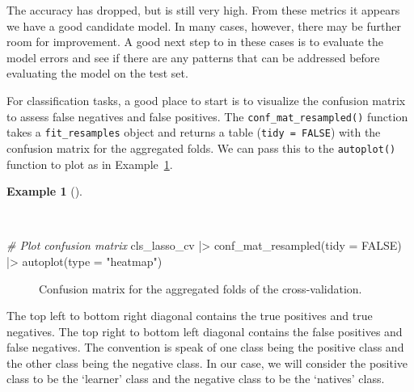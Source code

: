 \documentclass[
  letterpaper,
  DIV=11,
  numbers=noendperiod]{scrreprt}
\newenvironment{Shaded}{\begin{snugshade}}{\end{snugshade}}
\newcommand{\AttributeTok}[1]{\textcolor[rgb]{0.00,0.00,0.00}{#1}}
\newcommand{\CommentTok}[1]{\textcolor[rgb]{0.00,0.00,0.00}{\textit{#1}}}
\newcommand{\ConstantTok}[1]{\textcolor[rgb]{0.00,0.00,0.00}{#1}}
\newcommand{\FunctionTok}[1]{\textcolor[rgb]{0.00,0.00,0.00}{#1}}
\newcommand{\NormalTok}[1]{\textcolor[rgb]{0.00,0.00,0.00}{#1}}
\newcommand{\SpecialCharTok}[1]{\textcolor[rgb]{0.00,0.00,0.00}{#1}}
\newcommand{\StringTok}[1]{\textcolor[rgb]{0.00,0.00,0.00}{#1}}
\theoremstyle{definition}
\newtheorem{example}{Example}[chapter]
\theoremstyle{remark}
\begin{document}
The accuracy has dropped, but is still very high. From these metrics it
appears we have a good candidate model. In many cases, however, there
may be further room for improvement. A good next step to in these cases
is to evaluate the model errors and see if there are any patterns that
can be addressed before evaluating the model on the test set.

For classification tasks, a good place to start is to visualize the
confusion matrix to assess false negatives and false positives. The
\texttt{conf\_mat\_resampled()} function takes a \texttt{fit\_resamples}
object and returns a table (\texttt{tidy\ =\ FALSE}) with the confusion
matrix for the aggregated folds. We can pass this to the
\texttt{autoplot()} function to plot as in
Example~\ref{exm-pda-class-tune-hyperparameters-evaluate-workflow-cv-confusion}.

\begin{example}[]\protect\hypertarget{exm-pda-class-tune-hyperparameters-evaluate-workflow-cv-confusion}{}\label{exm-pda-class-tune-hyperparameters-evaluate-workflow-cv-confusion}

~

\begin{Shaded}
\begin{Highlighting}[]
\CommentTok{\# Plot confusion matrix}
\NormalTok{cls\_lasso\_cv }\SpecialCharTok{|\textgreater{}}
  \FunctionTok{conf\_mat\_resampled}\NormalTok{(}\AttributeTok{tidy =} \ConstantTok{FALSE}\NormalTok{) }\SpecialCharTok{|\textgreater{}}
  \FunctionTok{autoplot}\NormalTok{(}\AttributeTok{type =} \StringTok{"heatmap"}\NormalTok{)}
\end{Highlighting}
\end{Shaded}

\begin{figure}[H]


\caption{\label{fig-class-tune-hyperparameters-evaluate-workflow-cv-confusion}Confusion
matrix for the aggregated folds of the cross-validation.}

\end{figure}%

\end{example}

The top left to bottom right diagonal contains the true positives and
true negatives. The top right to bottom left diagonal contains the false
positives and false negatives. The convention is speak of one class
being the positive class and the other class being the negative class.
In our case, we will consider the positive class to be the `learner'
class and the negative class to be the `natives' class.
\end{document}
